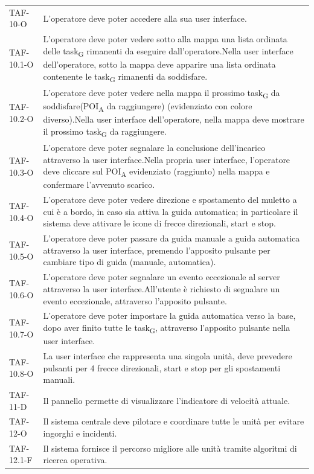 \begin{longtable}{ >{\centering}p{} >{}p{}}
	TAF-10-O & L'operatore deve poter accedere alla sua user interface.\tabularnewline
	
	TAF-10.1-O & L'operatore deve poter vedere sotto alla mappa una lista ordinata delle task\textsubscript{G} rimanenti da eseguire dall'operatore.\newline Nella user interface dell'operatore, sotto la mappa deve apparire una lista ordinata contenente le task\textsubscript{G} rimanenti da soddisfare.\tabularnewline
	TAF-10.2-O & L'operatore deve poter vedere nella mappa il prossimo task\textsubscript{G} da soddisfare(POI\textsubscript{A} da raggiungere) (evidenziato con colore diverso).\newline Nella user interface dell'operatore, nella mappa deve mostrare il prossimo task\textsubscript{G} da raggiungere.\tabularnewline
	TAF-10.3-O & L'operatore deve poter segnalare la conclusione dell'incarico attraverso la user interface.\newline Nella propria user interface, l'operatore deve cliccare sul POI\textsubscript{A} evidenziato (raggiunto) nella mappa e confermare l'avvenuto scarico.\tabularnewline
	TAF-10.4-O & L'operatore deve poter vedere direzione e spostamento del muletto a cui è a bordo, in caso sia attiva la guida automatica; in particolare il sistema deve attivare le icone di frecce direzionali, start e stop. \tabularnewline
	TAF-10.5-O & L'operatore deve poter passare da guida manuale a guida automatica attraverso la user interface, premendo l'apposito pulsante per cambiare tipo di guida (manuale, automatica).\tabularnewline
	TAF-10.6-O & L'operatore deve poter segnalare un evento eccezionale al server attraverso la user interface.\newline All'utente è richiesto di segnalare un evento eccezionale, attraverso l'apposito pulsante.\tabularnewline
	TAF-10.7-O & L'operatore deve poter impostare la guida automatica verso la base, dopo aver finito tutte le task\textsubscript{G}, attraverso l'apposito pulsante nella user interface.\tabularnewline
	TAF-10.8-O & La user interface che rappresenta una singola unità, deve prevedere pulsanti per 4 frecce direzionali, start e stop per gli spostamenti manuali.\tabularnewline

	TAF-11-D & Il pannello permette di visualizzare l'indicatore di velocità attuale.\tabularnewline

	TAF-12-O & Il sistema centrale deve pilotare e coordinare tutte le unità per evitare ingorghi e incidenti.\tabularnewline
	TAF-12.1-F & Il sistema fornisce il percorso migliore alle unità tramite algoritmi di ricerca operativa.\tabularnewline


\end{longtable}
